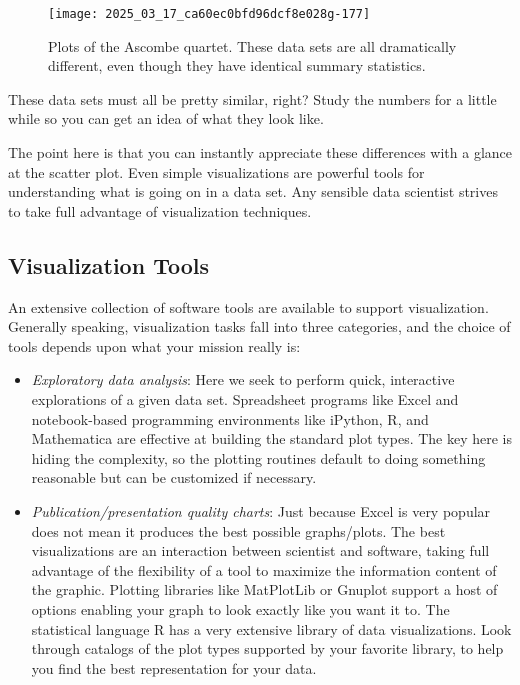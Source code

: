 \documentclass[10pt]{article}
\begin{document}
\begin{figure}[h]
    \centering
    \texttt{[image: 2025\_03\_17\_ca60ec0bfd96dcf8e028g-177]}
    \caption{Plots of the Ascombe quartet. These data sets are all dramatically different, even though they have identical summary statistics.}
\end{figure}

These data sets must all be pretty similar, right? Study the numbers for a little while so you can get an idea of what they look like.

The point here is that you can instantly appreciate these differences with a glance at the scatter plot. Even simple visualizations are powerful tools for understanding what is going on in a data set. Any sensible data scientist strives to take full advantage of visualization techniques.

\subsection{Visualization Tools}

An extensive collection of software tools are available to support visualization. Generally speaking, visualization tasks fall into three categories, and the choice of tools depends upon what your mission really is:

\begin{itemize}
  \item \emph{Exploratory data analysis}: Here we seek to perform quick, interactive explorations of a given data set. Spreadsheet programs like Excel and notebook-based programming environments like iPython, R, and Mathematica are effective at building the standard plot types. The key here is hiding the complexity, so the plotting routines default to doing something reasonable but can be customized if necessary.
\end{itemize}

\begin{itemize}
  \item \emph{Publication/presentation quality charts}: Just because Excel is very popular does not mean it produces the best possible graphs/plots. The best visualizations are an interaction between scientist and software, taking full advantage of the flexibility of a tool to maximize the information content of the graphic. Plotting libraries like MatPlotLib or Gnuplot support a host of options enabling your graph to look exactly like you want it to. The statistical language R has a very extensive library of data visualizations. Look through catalogs of the plot types supported by your favorite library, to help you find the best representation for your data.
\end{itemize}
\end{document}
